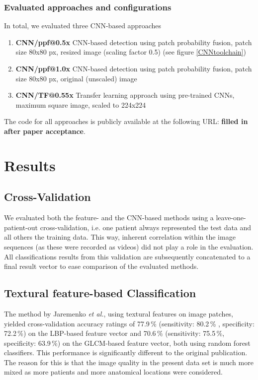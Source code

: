 \documentclass[fleqn,10pt]{wlscirep}
\begin{document}
\subsubsection*{Evaluated approaches and configurations}

In total, we evaluated three CNN-based approaches
\begin{enumerate}
\item \textbf{CNN/ppf@0.5x} CNN-based detection using patch
  probability fusion, patch size 80x80 px, resized image (scaling factor 0.5) (see figure
  \ref{CNNtoolchain})
\item \textbf{CNN/ppf@1.0x} CNN-based detection using patch
  probability fusion, patch size 80x80 px, original
  (unscaled) image
\item \textbf{CNN/TF@0.55x} Transfer learning approach using pre-trained CNNs, maximum square image, scaled to 224x224
\end{enumerate}


The code for all approaches is publicly available at the following URL: \textbf{filled in after paper acceptance}.



\section{Results}


\subsection{Cross-Validation}

We evaluated both the feature- and the CNN-based methods using a leave-one-patient-out
cross-validation, i.e. one patient always represented the
test data and all others the training data. This way, inherent
correlation within the image sequences (as these were recorded as
videos) did not play a role in the evaluation. All classifications
results from this validation are subsequently concatenated to a final
result vector to ease comparison of the evaluated methods.

\subsection{Textural feature-based Classification}

The method by Jaremenko \textit{et al.}\cite{Jaremenko:2015kh}, using textural
features on image patches,
yielded cross-validation accuracy ratings of  77.9\,\% (sensitivity: 80.2\,\% , specificity: 72.2\,\%) on the LBP-based feature vector and
70.6\,\% (sensitivity: 75.5\,\%, specificity: 63.9\,\%) on the GLCM-based feature
vector, both using random forest classifiers. This performance is
significantly different to the original publication. The reason for
this is that the image quality in the present data set is much more
mixed as more patients and more anatomical locations were considered.
\end{document}
